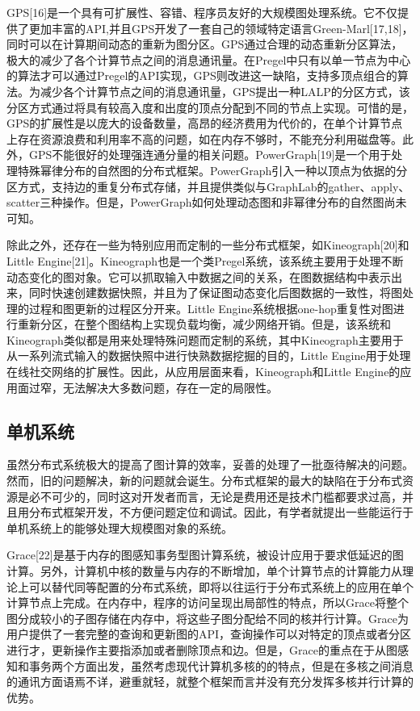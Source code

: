 GPS[16]是一个具有可扩展性、容错、程序员友好的大规模图处理系统。它不仅提供了更加丰富的API,并且GPS开发了一套自己的领域特定语言Green-Marl[17,18]，同时可以在计算期间动态的重新为图分区。GPS通过合理的动态重新分区算法，极大的减少了各个计算节点之间的消息通讯量。在Pregel中只有以单一节点为中心的算法才可以通过Pregel的API实现，GPS则改进这一缺陷，支持多顶点组合的算法。为减少各个计算节点之间的消息通讯量，GPS提出一种LALP的分区方式，该分区方式通过将具有较高入度和出度的顶点分配到不同的节点上实现。可惜的是，GPS的扩展性是以庞大的设备数量，高昂的经济费用为代价的，在单个计算节点上存在资源浪费和利用率不高的问题，如在内存不够时，不能充分利用磁盘等。此外，GPS不能很好的处理强连通分量的相关问题。PowerGraph[19]是一个用于处理特殊幂律分布的自然图的分布式框架。PowerGraph引入一种以顶点为依据的分区方式，支持边的重复分布式存储，并且提供类似与GraphLab的gather、apply、scatter三种操作。但是，PowerGraph如何处理动态图和非幂律分布的自然图尚未可知。

除此之外，还存在一些为特别应用而定制的一些分布式框架，如Kineograph[20]和Little Engine[21]。Kineograph也是一个类Pregel系统，该系统主要用于处理不断动态变化的图对象。它可以抓取输入中数据之间的关系，在图数据结构中表示出来，同时快速创建数据快照，并且为了保证图动态变化后图数据的一致性，将图处理的过程和图更新的过程区分开来。Little Engine系统根据one-hop重复性对图进行重新分区，在整个图结构上实现负载均衡，减少网络开销。但是，该系统和Kineograph类似都是用来处理特殊问题而定制的系统，其中Kineograph主要用于从一系列流式输入的数据快照中进行快熟数据挖掘的目的，Little Engine用于处理在线社交网络的扩展性。因此，从应用层面来看，Kineograph和Little Engine的应用面过窄，无法解决大多数问题，存在一定的局限性。

\subsection{单机系统}
虽然分布式系统极大的提高了图计算的效率，妥善的处理了一批亟待解决的问题。然而，旧的问题解决，新的问题就会诞生。分布式框架的最大的缺陷在于分布式资源是必不可少的，同时这对开发者而言，无论是费用还是技术门槛都要求过高，并且用分布式框架开发，不方便问题定位和调试。因此，有学者就提出一些能运行于单机系统上的能够处理大规模图对象的系统。

Grace[22]是基于内存的图感知事务型图计算系统，被设计应用于要求低延迟的图计算。另外，计算机中核的数量与内存的不断增加，单个计算节点的计算能力从理论上可以替代同等配置的分布式系统，即将以往运行于分布式系统上的应用在单个计算节点上完成。在内存中，程序的访问呈现出局部性的特点，所以Grace将整个图分成较小的子图存储在内存中，将这些子图分配给不同的核并行计算。Grace为用户提供了一套完整的查询和更新图的API，查询操作可以对特定的顶点或者分区进行才，更新操作主要指添加或者删除顶点和边。但是，Grace的重点在于从图感知和事务两个方面出发，虽然考虑现代计算机多核的的特点，但是在多核之间消息的通讯方面语焉不详，避重就轻，就整个框架而言并没有充分发挥多核并行计算的优势。

